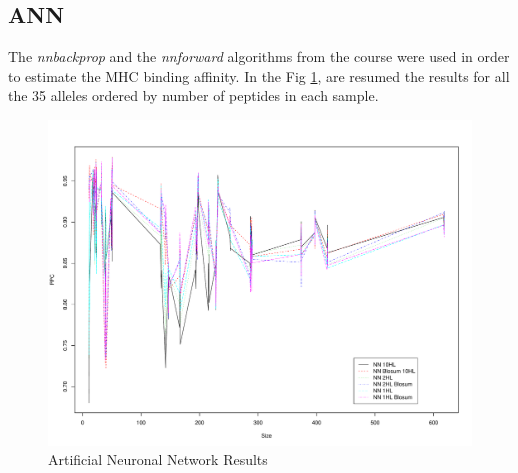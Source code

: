 \subsection*{ANN}
The \textit{nnbackprop} and the \textit{nnforward} algorithms from the course were used in order to estimate the MHC binding affinity.
In the Fig \ref{fig:ann1}, are resumed the results for all the 35 alleles ordered by number of peptides in each sample.
\begin{figure}
\begin{center}
\includegraphics[width=12cm]{fig/ann1.pdf}
\caption{Artificial Neuronal Network Results}\label{fig:ann1}
\end{center}
\end{figure}


